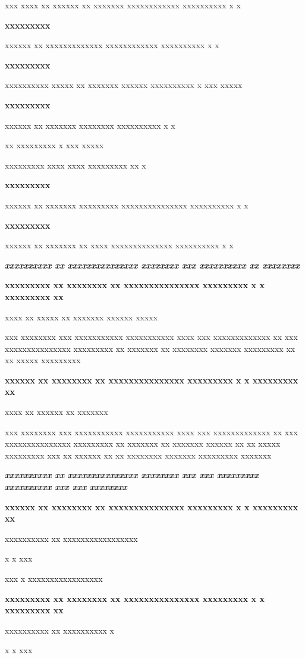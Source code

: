\documentclass[11pt,a4paper]{article}
\begin{document}
xxx xxxx xx xxxxxx xx xxxxxxx xxxxxxxxxxxx xxxxxxxxxx x x

\textbf{xxxxxxxxx}

xxxxxx xx xxxxxxxxxxxxx xxxxxxxxxxxx xxxxxxxxxx x x

\textbf{xxxxxxxxx}

xxxxxxxxxx xxxxx xx xxxxxxx xxxxxx xxxxxxxxxx x xxx xxxxx

\textbf{xxxxxxxxx}

xxxxxx xx xxxxxxx xxxxxxxx xxxxxxxxxx x x

xx xxxxxxxxx x xxx xxxxx

xxxxxxxxx xxxx xxxx xxxxxxxxx xx x

\textbf{xxxxxxxxx}

xxxxxx xx xxxxxxx xxxxxxxxx xxxxxxxxxxxxxxx xxxxxxxxxx x x

\textbf{xxxxxxxxx}

xxxxxx xx xxxxxxx xx xxxx xxxxxxxxxxxxxx xxxxxxxxxx x x

\textit{\textbf{xxxxxxxxxx xx xxxxxxxxxxxxxxx xxxxxxxx xxx xxxxxxxxxx xx xxxxxxxx}}

\textbf{xxxxxxxxx	xx xxxxxxxx xx xxxxxxxxxxxxxxx xxxxxxxxx x x xxxxxxxxx xx}

xxxx xx xxxxx xx xxxxxxx xxxxxx xxxxx

xxx xxxxxxxx xxx xxxxxxxxxxx xxxxxxxxxxx xxxx xxx xxxxxxxxxxxxx xx xxx xxxxxxxxxxxxxxx xxxxxxxxx xx xxxxxxx xx xxxxxxxx xxxxxxx xxxxxxxxx xx xx xxxxx xxxxxxxxx

\textbf{xxxxxx	xx xxxxxxxx xx xxxxxxxxxxxxxxx xxxxxxxxx x x xxxxxxxxx xx}

xxxx xx xxxxxx xx xxxxxxx

xxx xxxxxxxx xxx xxxxxxxxxxx xxxxxxxxxxx xxxx xxx xxxxxxxxxxxxx xx xxx xxxxxxxxxxxxxxx xxxxxxxxx xx xxxxxxx xx xxxxxxx xxxxxx xx xx xxxxx xxxxxxxxx xxx xx xxxxxx xx xx xxxxxxxx xxxxxxx xxxxxxxxx xxxxxxx

\textit{\textbf{xxxxxxxxxx xx xxxxxxxxxxxxxxx xxxxxxxx xxx xxx xxxxxxxxx xxxxxxxxxx xxx xxx xxxxxxxx}}

\textbf{xxxxxx	xx xxxxxxxx xx xxxxxxxxxxxxxxx xxxxxxxxx x x xxxxxxxxx xx}

xxxxxxxxxx xx xxxxxxxxxxxxxxxxx

x x xxx

xxx x xxxxxxxxxxxxxxxxx

\textbf{xxxxxxxxx		xx xxxxxxxx xx xxxxxxxxxxxxxxx xxxxxxxxx x x xxxxxxxxx xx}

xxxxxxxxxx xx xxxxxxxxxx x

x x xxx
\end{document}
